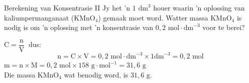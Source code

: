    \noindent
\par


      \begin{wex}{Berekening van Konsentrasie II }
{
Jy het 'n $1 {\text{ dm}}^{3}$ houer waarin 'n oplossing van kaliumpermanganaat ($\text{KMnO}{}_{4}$) gemaak moet word. Watter massa $\text{KMnO}{}_{4}$ is nodig is om 'n oplossing met 'n konsentrasie van $0,2 \text{ mol}\cdot \text{dm}^{-3}$ voor te berei? 
     }
{
$\text{C}=\dfrac{\text{n}}{\text{V}}~$ dus:
      \label{m38712*id283321}\nopagebreak\noindent{}        
    \begin{equation*}
    \text{n}=\text{C}\ensuremath{\times}\text{V}=0,2 \text{ mol} \cdot \text{dm}^{-3} \times 1 \text{dm}^{-3} = 0,2 \text{ mol}
      \end{equation*}
$\text{m}=\text{n} \times \text{M} = 0,2 \text{ mol} \times 158 \text{ g} \cdot \text{mol}^{-1} = 31,6 \text{ g}$\\
Die massa $\text{KMnO}{}_{4}$ wat benodig word, is $31,6 \text{ g}$.
 
}
    \end{wex}
    \noindent
\label{m38712*secfhsst!!!underscore!!!id1795} 


